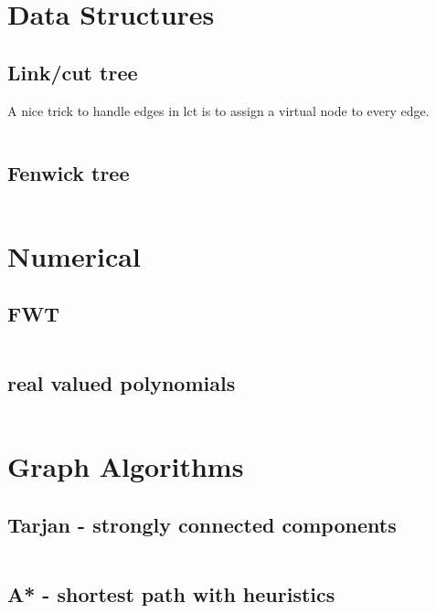 \documentclass[portrait, 8pt, a4paper, oneside, landscape]{extarticle}
\begin{document}
\thispagestyle{empty}
\begin{figure}[h!]

\end{figure}
\newpage

\twocolumn
\maketitlepage
\newpage

\section{Data Structures}
\subsection{Link/cut tree}
A nice trick to handle edges in lct is to assign a virtual node to every edge.
\inputminted{cpp}{src/lct.cpp}
\subsection{Fenwick tree}
\inputminted{cpp}{src/fenwick2d.cpp}

\section{Numerical}
\subsection{FWT}
\inputminted{cpp}{src/fwt.cpp}

\subsection{real valued polynomials}
\inputminted{cpp}{src/poly.cpp}

\section{Graph Algorithms}

\subsection{Tarjan - strongly connected components}
\inputminted{cpp}{src/scc.cpp}

\subsection{A* - shortest path with heuristics}
\inputminted{rust}{src/a_star.rs}
\end{document}

